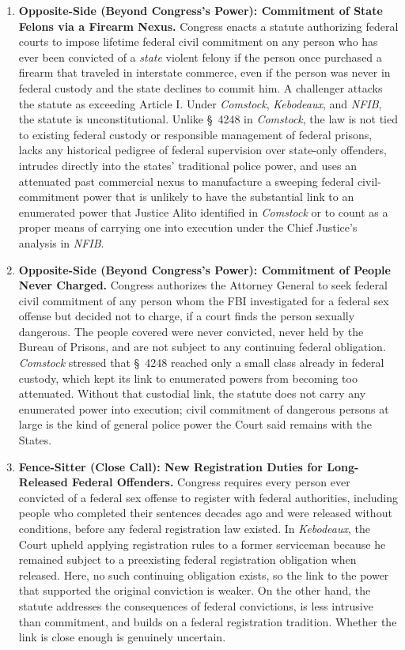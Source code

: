 \documentclass[12pt]{article}
\begin{document}
\begin{enumerate}
\item \textbf{Opposite-Side (Beyond Congress's Power): Commitment of State Felons via a Firearm Nexus.} Congress enacts a statute authorizing federal courts to impose lifetime federal civil commitment on any person who has ever been convicted of a \emph{state} violent felony if the person once purchased a firearm that traveled in interstate commerce, even if the person was never in federal custody and the state declines to commit him. A challenger attacks the statute as exceeding Article I. Under \textit{Comstock}, \textit{Kebodeaux}, and \textit{NFIB}, the statute is unconstitutional. Unlike \S~4248 in \textit{Comstock}, the law is not tied to existing federal custody or responsible management of federal prisons, lacks any historical pedigree of federal supervision over state-only offenders, intrudes directly into the states' traditional police power, and uses an attenuated past commercial nexus to manufacture a sweeping federal civil-commitment power that is unlikely to have the substantial link to an enumerated power that Justice Alito identified in \textit{Comstock} or to count as a proper means of carrying one into execution under the Chief Justice's analysis in \textit{NFIB}.

\item \textbf{Opposite-Side (Beyond Congress's Power): Commitment of People Never Charged.} Congress authorizes the Attorney General to seek federal civil commitment of any person whom the FBI investigated for a federal sex offense but decided not to charge, if a court finds the person sexually dangerous. The people covered were never convicted, never held by the Bureau of Prisons, and are not subject to any continuing federal obligation. \textit{Comstock} stressed that \S~4248 reached only a small class already in federal custody, which kept its link to enumerated powers from becoming too attenuated. Without that custodial link, the statute does not carry any enumerated power into execution; civil commitment of dangerous persons at large is the kind of general police power the Court said remains with the States.

\item \textbf{Fence-Sitter (Close Call): New Registration Duties for Long-Released Federal Offenders.} Congress requires every person ever convicted of a federal sex offense to register with federal authorities, including people who completed their sentences decades ago and were released without conditions, before any federal registration law existed. In \textit{Kebodeaux}, the Court upheld applying registration rules to a former serviceman because he remained subject to a preexisting federal registration obligation when released. Here, no such continuing obligation exists, so the link to the power that supported the original conviction is weaker. On the other hand, the statute addresses the consequences of federal convictions, is less intrusive than commitment, and builds on a federal registration tradition. Whether the link is close enough is genuinely uncertain.

\end{enumerate}
\end{document}
